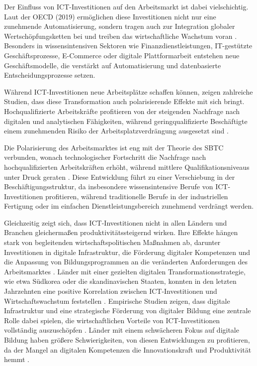 
Der Einfluss von \ac{ICT}-Investitionen auf den Arbeitsmarkt ist dabei vielschichtig. Laut 
der \ac{OECD} (2019) ermöglichen diese Investitionen nicht nur eine zunehmende 
Automatisierung, sondern tragen auch zur Integration globaler Wertschöpfungsketten bei 
und treiben das wirtschaftliche Wachstum voran 
\parencite[vgl.][S. 144]{oecd2019measuring}. Besonders in wissensintensiven Sektoren wie 
Finanzdienstleistungen, \ac{IT}-gestützte Geschäftsprozesse, E-Commerce oder digitale 
Plattformarbeit entstehen neue Geschäftsmodelle, die verstärkt auf Automatisierung und 
datenbasierte Entscheidungsprozesse setzen.

Während \ac{ICT}-Investitionen neue Arbeitsplätze schaffen können, zeigen zahlreiche 
Studien, dass diese Transformation auch polarisierende Effekte mit sich bringt. 
Hochqualifizierte Arbeitskräfte profitieren von der steigenden Nachfrage nach digitalen 
und analytischen Fähigkeiten, während geringqualifizierte Beschäftigte einem zunehmenden 
Risiko der Arbeitsplatzverdrängung ausgesetzt sind 
\parencite[vgl.][Kap. 2]{brynjolfsson2014thesecond}.

Die Polarisierung des Arbeitsmarktes ist eng mit der Theorie des \ac{SBTC} verbunden, 
wonach technologischer Fortschritt die Nachfrage nach hochqualifizierten Arbeitskräften 
erhöht, während mittlere Qualifikationsniveaus unter Druck geraten 
\parencite[vgl.][S. 22]{acemoglu2002technical}. Diese Entwicklung führt zu einer 
Verschiebung in der Beschäftigungsstruktur, da insbesondere wissensintensive Berufe von 
\ac{ICT}-Investitionen profitieren, während traditionelle Berufe in der industriellen 
Fertigung oder im einfachen Dienstleistungsbereich zunehmend verdrängt werden.

Gleichzeitig zeigt sich, dass \ac{ICT}-Investitionen nicht in allen Ländern und Branchen 
gleichermaßen produktivitätssteigernd wirken. Ihre Effekte hängen stark von begleitenden 
wirtschaftspolitischen Maßnahmen ab, darunter Investitionen in digitale Infrastruktur, 
die Förderung digitaler Kompetenzen und die Anpassung von Bildungsprogrammen an die 
veränderten Anforderungen des Arbeitsmarktes 
\parencite[vgl.][S. 77]{brynjolfsson2014thesecond}. Länder mit einer gezielten digitalen 
Transformationsstrategie, wie etwa Südkorea oder die skandinavischen Staaten, konnten in 
den letzten Jahrzehnten eine positive Korrelation zwischen \ac{ICT}-Investitionen und 
Wirtschaftswachstum feststellen \parencite[vgl.][S. 34]{oecd2020digital}. Empirische 
Studien zeigen, dass digitale Infrastruktur und eine strategische Förderung von digitaler 
Bildung eine zentrale Rolle dabei spielen, die wirtschaftlichen Vorteile von 
\ac{ICT}-Investitionen vollständig auszuschöpfen \parencite[vgl.][S. 360]{vu2011ict}. 
Länder mit einem schwächeren Fokus auf digitale Bildung haben größere Schwierigkeiten, 
von diesen Entwicklungen zu profitieren, da der Mangel an digitalen Kompetenzen die 
Innovationskraft und Produktivität hemmt \parencite[vgl.][S. 34]{oecd2020digital}.

